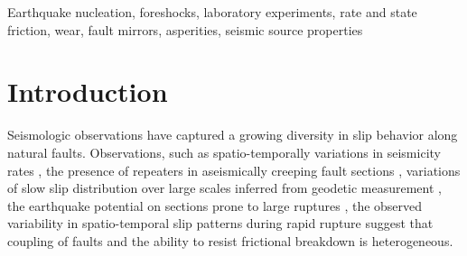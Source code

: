\documentclass[preprint,1p, 10pt,authoryear]{elsarticle}
\begin{document}
\begin{frontmatter}


\begin{keyword}
Earthquake nucleation, foreshocks, laboratory experiments, rate and state friction, wear, fault mirrors, asperities, seismic source properties
\end{keyword}

\end{frontmatter}
\doublespacing
\linenumbers



\section{Introduction}
\label{int}
Seismologic observations have captured a growing diversity in slip behavior along natural faults. Observations, such as spatio-temporally variations in seismicity rates \citep{Tormann2014, Tormann2015, Gulia2016,Gulia2019}, the presence of repeaters in aseismically creeping fault sections \citep[e.g.][]{Nadeau1994, Nadeau1999, Shirzaei2013, Uchida2019}, variations of slow slip distribution over large scales inferred from geodetic measurement  \citep[e.g.][]{Brodsky2014, Ruiz2014, Socquet2017}, the earthquake potential on sections prone to large ruptures \citep{Buergmann2000,Buergmann2004}, the observed variability in spatio-temporal slip patterns during rapid rupture \citep[e.g.][]{Mai2002, Tinti2005, Dreger2007, Galvez2016, Mai2018} suggest that coupling of faults and the ability to resist frictional breakdown is heterogeneous. 
\end{document}
